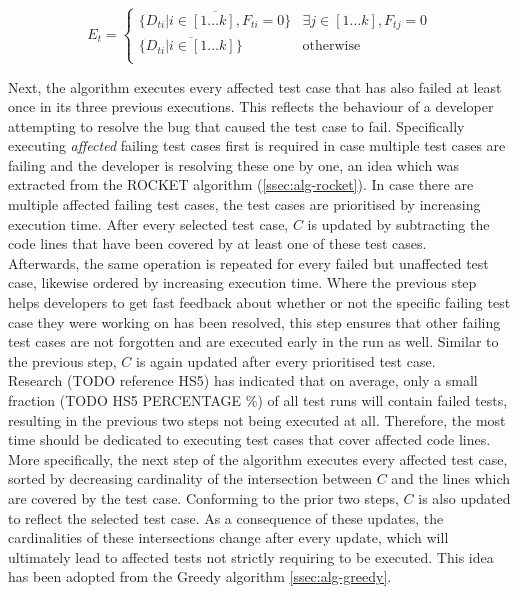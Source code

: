 \[
	E_t = \left.
	\begin{cases}
		\overline{\{D_{ti} \vert i \in [1 \dots k], F_{ti} = 0\}} & \exists j \in [1 \dots k], F_{tj} = 0 \\
		\overline{\{D_{ti} \vert i \in [1 \dots k]\}} & \text{otherwise} \\
	\end{cases}
	\right.
\]

\noindent Next, the algorithm executes every affected test case that has also failed at least once in its three previous executions. This reflects the behaviour of a developer attempting to resolve the bug that caused the test case to fail. Specifically executing \emph{affected} failing test cases first is required in case multiple test cases are failing and the developer is resolving these one by one, an idea which was extracted from the ROCKET algorithm (\autoref{ssec:alg-rocket}). In case there are multiple affected failing test cases, the test cases are prioritised by increasing execution time. After every selected test case, $C$ is updated by subtracting the code lines that have been covered by at least one of these test cases.\\

\noindent Afterwards, the same operation is repeated for every failed but unaffected test case, likewise ordered by increasing execution time. Where the previous step helps developers to get fast feedback about whether or not the specific failing test case they were working on has been resolved, this step ensures that other failing test cases are not forgotten and are executed early in the run as well. Similar to the previous step, $C$ is again updated after every prioritised test case.\\

\noindent Research (TODO reference HS5) has indicated that on average, only a small fraction (TODO HS5 PERCENTAGE \%) of all test runs will contain failed tests, resulting in the previous two steps not being executed at all. Therefore, the most time should be dedicated to executing test cases that cover affected code lines. More specifically, the next step of the algorithm executes every affected test case, sorted by decreasing cardinality of the intersection between $C$ and the lines which are covered by the test case. Conforming to the prior two steps, $C$ is also updated to reflect the selected test case. As a consequence of these updates, the cardinalities of these intersections change after every update, which will ultimately lead to affected tests not strictly requiring to be executed. This idea has been adopted from the Greedy algorithm \autoref{ssec:alg-greedy}.\\

